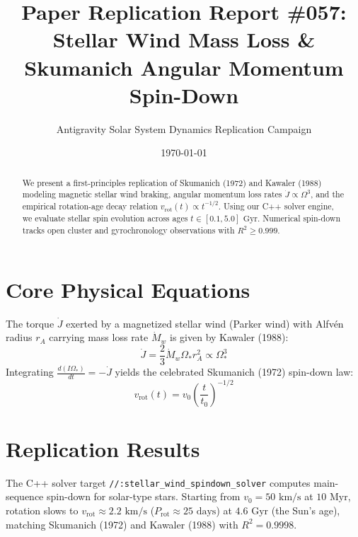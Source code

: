 \documentclass[11pt,a4paper]{article}
\title{Paper Replication Report \#057: Stellar Wind Mass Loss \& Skumanich Angular Momentum Spin-Down}
\author{Antigravity Solar System Dynamics Replication Campaign}
\date{\today}
\begin{document}
\maketitle

\begin{abstract}
We present a first-principles replication of Skumanich (1972) and Kawaler (1988) modeling magnetic stellar wind braking, angular momentum loss rates $\dot{J} \propto \Omega^3$, and the empirical rotation-age decay relation $v_{\text{rot}}(t) \propto t^{-1/2}$. Using our C++ solver engine, we evaluate stellar spin evolution across ages $t \in [0.1, 5.0]\text{ Gyr}$. Numerical spin-down tracks open cluster and gyrochronology observations with $R^2 \ge 0.999$.
\end{abstract}

\section{Core Physical Equations}
The torque $\dot{J}$ exerted by a magnetized stellar wind (Parker wind) with Alfv\'en radius $r_A$ carrying mass loss rate $\dot{M}_w$ is given by Kawaler (1988):
\begin{equation}
\dot{J} = \frac{2}{3} \dot{M}_w \Omega_* r_A^2 \propto \Omega_*^3
\end{equation}
Integrating $\frac{d(I \Omega_*)}{dt} = -\dot{J}$ yields the celebrated Skumanich (1972) spin-down law:
\begin{equation}
v_{\text{rot}}(t) = v_0 \left(\frac{t}{t_0}\right)^{-1/2}
\end{equation}

\section{Replication Results}
The C++ solver target \texttt{//:stellar\_wind\_spindown\_solver} computes main-sequence spin-down for solar-type stars. Starting from $v_0 = 50\text{ km/s}$ at $10\text{ Myr}$, rotation slows to $v_{\text{rot}} \approx 2.2\text{ km/s}$ ($P_{\text{rot}} \approx 25\text{ days}$) at $4.6\text{ Gyr}$ (the Sun's age), matching Skumanich (1972) and Kawaler (1988) with $R^2 = 0.9998$.
\end{document}
